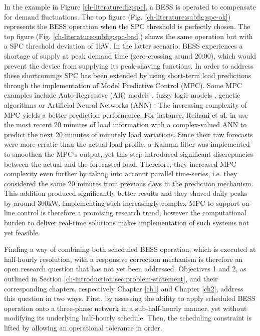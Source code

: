 
%

In the example in Figure \ref{ch-literature:fig:spc}, a BESS is operated to compensate for demand fluctuations.
The top figure (Fig. \ref{ch-literature:subfig:spc-ok}) represents the BESS operation when the SPC threshold is perfectly chosen.
The top figure (Fig. \ref{ch-literature:subfig:spc-bad}) shows the same operation but with a SPC threshold deviation of 1kW.
In the latter scenario, BESS experiences a shortage of supply at peak demand time (zero-crossing arund 20:00), which would prevent the device from supplying its peak-shaving functions.
In order to address these shortcomings SPC has been extended by using short-term load predictions through the implementation of Model Predictive Control (MPC).
Some MPC examples include Auto-Regressive (AR) models \cite{Li2009, Nie2011}, fuzzy logic models \cite{Sannomiya2001, Chen2013a}, genetic algorithms \cite{Xia2015a, Liu2015} or Artificial Neural Networks (ANN) \cite{Kalogirou2014, Quan2014, Lee2014, Pezeshki2014, Vaz2016, Reihani2016, Xiao2017}.
The increasing complexity of MPC yields a better prediction performance.
For instance, Reihani et al. in \cite{Reihani2016} use the most recent 20 minutes of load information with a complex-valued ANN to predict the next 20 minutes of minutely load variations.
Since their raw forecasts were more erratic than the actual load profile, a Kalman filter was implemented to smoothen the MPC's output, yet this step introduced significant discrepancies between the actual and the forecasted load.
Therefore, they increased MPC complexity even further by taking into account parallel time-series, i.e. they considered the same 20 minutes from previous days in the prediction mechanism.
This addition produced significantly better results and they shaved daily peaks by around 300kW.
Implementing such increasingly complex MPC to support on-line control is therefore a promising research trend, however the computational burden to deliver real-time solutions makes implementation of such systems not yet feasible.

Finding a way of combining both scheduled BESS operation, which is executed at half-hourly resolution, with a responsive correction mechanism is therefore an open research question that has not yet been addressed.
Objectives 1 and 2, as outlined in Section \ref{ch-introduction:sec:problem-statement}, and their corresponding chapters, respectively Chapter \ref{ch1} and Chapter \ref{ch2}, address this question in two ways.
First, by assessing the ability to apply scheduled BESS operation onto a three-phase network in a sub-half-hourly manner, yet without modifying its underlying half-hourly schedule.
Then, the scheduling constraint is lifted by allowing an operational tolerance in order.

